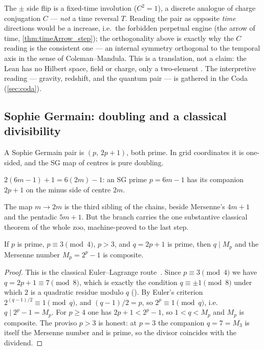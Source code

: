 \begin{remark}
The $\pm$ side flip is a fixed-time involution ($C^2=1$), a discrete analogue of charge conjugation
$C$ --- \emph{not} a time reversal $T$. Reading the pair as opposite \emph{time} directions would be a
 increase, i.e.\ the forbidden perpetual engine (the arrow of time,
\cref{thm:timeArrow_step}); the orthogonality above is exactly why the $C$ reading is the consistent
one --- an internal symmetry orthogonal to the temporal axis in the sense of Coleman--Mandula. This is
a translation, not a claim: the Lean has no Hilbert space, field or charge, only a two-element
. The interpretive reading --- gravity, redshift, and the quantum pair --- is gathered in
the Coda (\cref{sec:coda}).
\end{remark}

\subsection{Sophie Germain: doubling and a classical divisibility}

A Sophie Germain pair is $(p,\,2p+1)$, both prime. In grid coordinates it is one-sided, and
the SG map of centres is pure doubling.

\begin{theorem}\label{thm:sg_center_doubling}
\green{}\; $2(6m-1)+1 = 6(2m)-1$: an SG prime $p=6m-1$ has its companion $2p+1$ on the minus
side of centre $2m$. 
\end{theorem}

The map $m\to 2m$ is the third sibling of the chains, beside Mersenne's $4m+1$ and the pentadic
$5m+1$. But the branch carries the one substantive classical theorem of the whole zoo,
machine-proved to the last step.

\begin{theorem}\label{thm:sophieGermain_divides_mersenne}
\green{}\; If $p$ is prime, $p\equiv 3\pmod 4$, $p>3$, and $q=2p+1$ is prime, then $q\mid M_p$
and the Mersenne number $M_p=2^p-1$ is composite.
\end{theorem}

\begin{proof}
This is the classical Euler--Lagrange route~\cite{hardy-wright}. Since $p\equiv3\pmod4$ we have
$q=2p+1\equiv7\pmod8$, which is exactly the condition $q\equiv\pm1\pmod8$ under which $2$ is a
quadratic residue modulo $q$ (). By Euler's criterion
$2^{(q-1)/2}\equiv 1\pmod q$, and $(q-1)/2=p$, so $2^p\equiv 1\pmod q$, i.e.\ $q\mid 2^p-1=M_p$.
For $p\ge4$ one has $2p+1<2^p-1$, so $1<q<M_p$ and
$M_p$ is composite. The proviso $p>3$ is honest: at $p=3$ the companion $q=7=M_3$ is itself the
Mersenne number and is prime, so the divisor coincides with the dividend.
\end{proof}

